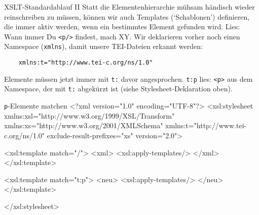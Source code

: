 \begin{frame}{XSLT-Standardablauf II}
Statt die Elementenhierarchie mühsam händisch wieder reinschreiben zu müssen, können wir auch Templates (`Schablonen') definieren, die immer aktiv werden, wenn ein bestimmtes Element gefunden wird. Lies: Wann immer Du \texttt{<p/>} findest, mach XY.
Wir deklarieren vorher noch einen Namespace (\texttt{xmlns}), damit unsere TEI-Dateien erkannt werden:
\begin{verbatim}
    xmlns:t="http://www.tei-c.org/ns/1.0"
\end{verbatim}
Elemente müssen jetzt immer mit \texttt{t:} davor angesprochen. \texttt{t:p} lies: \texttt{<p>} aus dem Namespace, der mit \texttt{t:} abgekürzt ist (siehe Stylesheet-Deklaration oben).
\begin{myxml}{\texttt{p}-Elemente matchen}
<?xml version="1.0" encoding="UTF-8"?>
<xsl:stylesheet xmlns:xsl="http://www.w3.org/1999/XSL/Transform"
    xmlns:xs="http://www.w3.org/2001/XMLSchema"
    xmlns:t="http://www.tei-c.org/ns/1.0"
    exclude-result-prefixes="xs"
    version="2.0">
       
    <xsl:template match="/">
        <xml>
            <xsl:apply-templates/> 
        </xml>
    </xsl:template>
    
    <xsl:template match="t:p">
        <neu>
            <xsl:apply-templates/>
        </neu>
    </xsl:template>
    
</xsl:stylesheet>
\end{myxml}

\end{frame}

